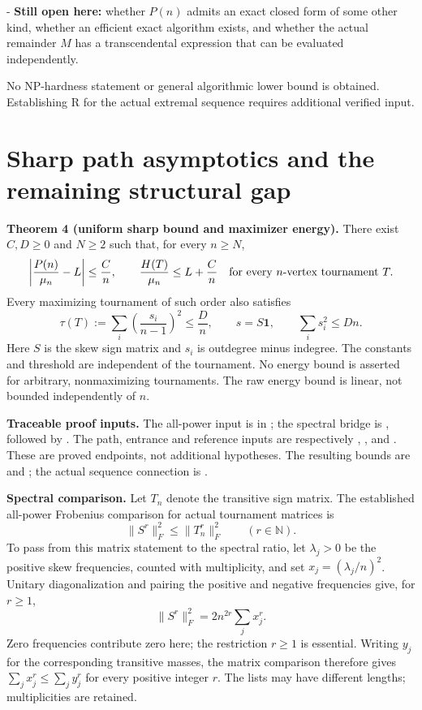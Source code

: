 \documentclass[11pt]{article}
\begin{document}
- \textbf{Still open here:} whether $P(n)$ admits an exact closed form of some other kind, whether an efficient exact algorithm exists, and whether the actual remainder $M$ has a transcendental expression that can be evaluated independently.

No NP-hardness statement or general algorithmic lower bound is obtained. Establishing R for the actual extremal sequence requires additional verified input.

\section{Sharp path asymptotics and the remaining structural gap}
\textbf{Theorem 4 (uniform sharp bound and maximizer energy).}
There exist $C,D\ge0$ and $N\ge2$ such that, for every $n\ge N$,
\[
 \left|\frac{P(n)}{\mu_n}-L\right|\le\frac Cn,
 \qquad \frac{H(T)}{\mu_n}\le L+\frac Cn
 \quad\hbox{for every $n$-vertex tournament }T.
\]
Every maximizing tournament of such order also satisfies
\[
 \tau(T):=\sum_i\left(\frac{s_i}{n-1}\right)^2\le\frac Dn,
 \qquad s=S\mathbf1,
 \qquad \sum_i s_i^2\le Dn.
\]
Here $S$ is the skew sign matrix and $s_i$ is outdegree minus indegree.
The constants and threshold are independent of the tournament. No energy
bound is asserted for arbitrary, nonmaximizing tournaments. The raw energy
bound is linear, not bounded independently of $n$.

\textbf{Traceable proof inputs.} The all-power input is
 in ; the spectral bridge is
, followed by
.
The path, entrance and reference inputs are respectively
,
, and
.
These are proved endpoints, not additional hypotheses. The resulting bounds are
 and
; the actual
sequence connection is
.

\textbf{Spectral comparison.} Let $T_n$ denote the transitive sign matrix.
The established all-power Frobenius comparison for actual tournament matrices is
\[
 \|S^r\|_F^2\le\|T_n^r\|_F^2\qquad(r\in\mathbb N).
\]
To pass from this matrix statement to the spectral ratio, let $\lambda_j>0$
be the positive skew frequencies, counted with multiplicity, and set
$x_j=(\lambda_j/n)^2$. Unitary diagonalization and pairing the positive
and negative frequencies give, for $r\ge1$,
\[
 \|S^r\|_F^2=2n^{2r}\sum_jx_j^r.
\]
Zero frequencies contribute zero here; the restriction $r\ge1$ is essential.
Writing $y_j$ for the corresponding transitive masses, the matrix comparison
therefore gives $\sum_jx_j^r\le\sum_jy_j^r$ for every positive integer $r$.
The lists may have different lengths; multiplicities are retained.
\end{document}
